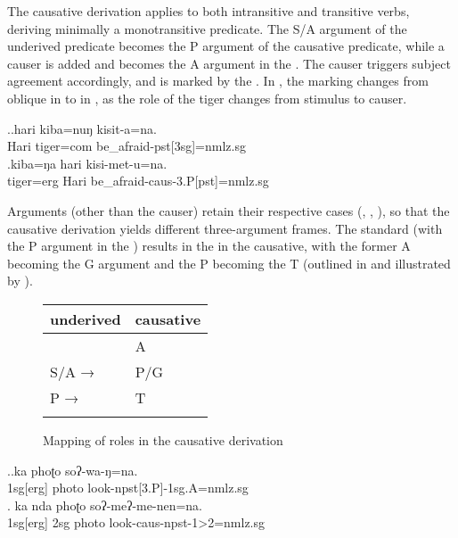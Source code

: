 The causative derivation applies to both intransitive and transitive verbs, deriving minimally a monotransitive predicate. The S/A argument of the underived predicate becomes the P argument of the cau\-sa\-tive predicate, while a causer is added and becomes the A argument in the . The causer triggers  subject agreement accordingly, and is marked by the  . In \Next, the  marking changes from oblique in \Next[a] to  in \Next[b], as the role of the tiger changes from stimulus to causer.

\ex.\ag.hari kiba=nuŋ kisit-a=na.\\
Hari tiger{\sc =com} be\_afraid{\sc -pst[3sg]=nmlz.sg}\\
\bg.kiba=ŋa hari kisi-met-u=na.\\
tiger{\sc =erg} Hari be\_afraid{\sc -caus-3.P[pst]=nmlz.sg}\\


Arguments (other than the causer) retain their respective cases (, , ), so that the causative derivation yields different three-argument frames. The standard  (with the P argument in the ) results in the  in the causative, with the former A becoming the G argument and the P becoming the T (outlined in  and illustrated by \Next). 

\begin{figure}[htp]
\begin{center}
{\small
\begin{tabular}{ll}
\lsptoprule
{\sc underived}&{\sc causative} \\
\midrule
& A\\
S/A →&P/G \\
P →& T\\

\lspbottomrule
\end{tabular}
}
\end{center}
\caption{Mapping of roles in the causative derivation}\label{fig-caus}
\end{figure}
 
 

 
\ex.\ag.ka phoʈo soʔ-wa-ŋ=na.\\
{\sc 1sg[erg]} photo look{\sc -npst[3.P]-1sg.A=nmlz.sg}\\
\bg. ka nda phoʈo soʔ-meʔ-me-nen=na.\\
{\sc 1sg[erg]} {\sc 2sg} photo look{\sc -caus-npst-1>2=nmlz.sg}\\
 
